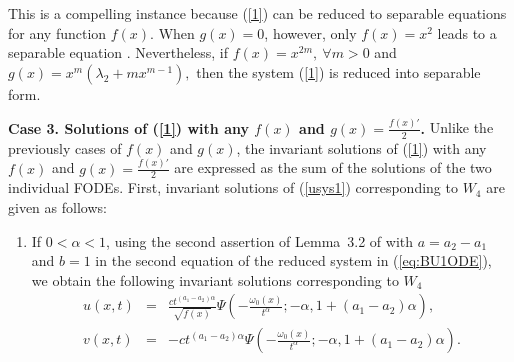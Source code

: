 \documentclass[12pt]{amsart}
\begin{document}
This is a compelling instance because (\ref{1}) can be reduced to separable equations for any function $f(x)$. When $g(x)=0$, however, only $f(x)=x^2$ leads to a separable equation 
\cite{ourJMP}. 
Nevertheless, if $f(x)=x^{2m}, ~\forall m>0$ and $g(x)=x^m(\lambda_2+mx^{m-1}),$ then the system (\ref{1}) is reduced into separable form.

\textbf{Case 3. Solutions of (\ref{1}) with any $f(x)$ and $g(x)=\frac{f(x)'}{2}$.}
Unlike the previously cases of $f(x)$ and $g(x)$, the invariant solutions of (\ref{1}) with any $f(x)$ and $g(x)=\frac{f(x)'}{2}$ are expressed
as the sum of the solutions of the two individual FODEs. First, invariant solutions of (\ref{usys1})
corresponding to $W_4$ are given as follows:
\begin{enumerate}
\item If $0<\alpha<1$, using the second assertion of Lemma~3.2 of \cite{ourJMP} 
with $a=a_2-a_1$ and $b=1$ in the second equation of the reduced system in (\ref{eq:BU1ODE}), we obtain the following invariant solutions corresponding to $W_4$
\begin{eqnarray}\label{sol3}
u(x,t)&=&\frac{ct^{(a_1-a_2)\alpha}}{\sqrt{f(x)}}\Psi\left(-\frac{\omega_0(x)}{t^{\alpha}};-\alpha,1+(a_1-a_2)\alpha\right)\nonumber,\\
v(x,t)&=&-ct^{(a_1-a_2)\alpha}\Psi\left(-\frac{\omega_0(x)}{t^{\alpha}};-\alpha,1+(a_1-a_2)\alpha\right).
\end{eqnarray}


\end{enumerate}
\end{document}
